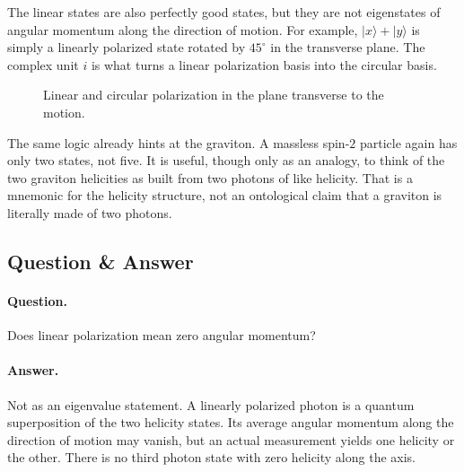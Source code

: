 The linear states are also perfectly good states, but they are not eigenstates of angular momentum along the direction of motion. For example, \(|x\rangle+|y\rangle\) is simply a linearly polarized state rotated by \(45^\circ\) in the transverse plane. The complex unit \(i\) is what turns a linear polarization basis into the circular basis.

\begin{figure}[t]
\centering
{}
\caption{Linear and circular polarization in the plane transverse to the motion.}
\end{figure}

The same logic already hints at the graviton. A massless spin-\(2\) particle again has only two states, not five. It is useful, though only as an analogy, to think of the two graviton helicities as built from two photons of like helicity. That is a mnemonic for the helicity structure, not an ontological claim that a graviton is literally made of two photons.

\subsection{Question \& Answer}

\paragraph{Question.} Does linear polarization mean zero angular momentum?

\paragraph{Answer.} Not as an eigenvalue statement. A linearly polarized photon is a quantum superposition of the two helicity states. Its average angular momentum along the direction of motion may vanish, but an actual measurement yields one helicity or the other. There is no third photon state with zero helicity along the axis.

